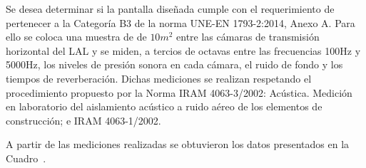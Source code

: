 \par Se desea determinar si la pantalla diseñada cumple con el requerimiento de pertenecer a la Categoría B3 de la norma UNE-EN 1793-2:2014, Anexo A. Para ello se coloca una muestra de de $10 m^2$ entre las cámaras de transmisión horizontal del LAL y se miden, a tercios de octavas entre las frecuencias  100Hz y 5000Hz, los niveles de presión sonora en cada cámara, el ruido de fondo y los tiempos de reverberación. Dichas mediciones se realizan respetando el procedimiento propuesto por la Norma IRAM 4063-3/2002: Acústica. Medición en laboratorio del aislamiento acústico a ruido aéreo de los elementos de construcción; e IRAM 4063-1/2002.

\par A partir de las mediciones realizadas se obtuvieron los datos presentados en la Cuadro~.

